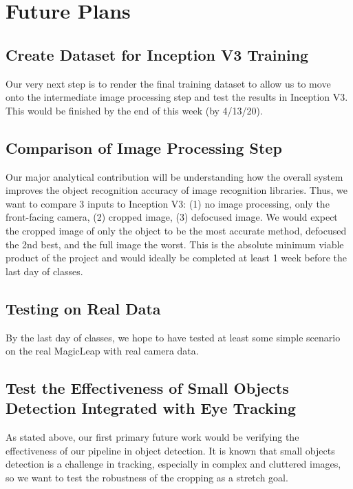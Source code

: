 \vspace{-1em}
\section{Future Plans}
\subsection{Create Dataset for Inception V3 Training}
Our very next step is to render the final training dataset to allow us to move onto the intermediate image processing step and test the results in Inception V3. This would be finished by the end of this week (by 4/13/20).

\subsection{Comparison of Image Processing Step}
Our major analytical contribution will be understanding how the overall system improves the object recognition accuracy of image recognition libraries. Thus, we want to compare 3 inputs to Inception V3: (1) no image processing, only the front-facing camera, (2) cropped image, (3) defocused image. We would expect the cropped image of only the object to be the most accurate method, defocused the 2nd best, and the full image the worst. This is the absolute minimum viable product of the project and would ideally be completed at least 1 week before the last day of classes.

\subsection{Testing on Real Data}
By the last day of classes, we hope to have tested at least some simple scenario on the real MagicLeap with real camera data.

\subsection{Test the Effectiveness of Small Objects Detection Integrated with Eye Tracking}
As stated above, our first primary future work would be verifying the effectiveness of our pipeline in object detection. It is known that small objects detection is a challenge in tracking, especially in complex and cluttered images, so we want to test the robustness of the cropping as a stretch goal.




